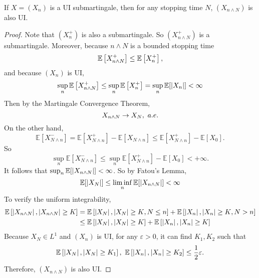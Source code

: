 \begin{thm}
    If $X=(X_n)$ is a UI submartingale, then for any stopping time $N$, $(X_{n \wedge N})$ is also UI.
\end{thm}
\begin{proof}
    Note that $(X_n^+)$ is also a submartingale. So $(X_{n \wedge N}^+)$ is a submartingale. Moreover, because $n \wedge N$ is a bounded stopping time
    \begin{equation*}
        \mathbb{E}\left[X_{n \wedge N}^+\right] \leq \mathbb{E}\left[X_n^+\right],
    \end{equation*}
    and because $(X_n)$ is UI,
    \begin{equation*}
        \sup_n\mathbb{E}\left[X_{n \wedge N}^+\right] \leq \sup_n\mathbb{E}\left[X_n^+\right] = \sup_n \mathbb{E}[\left\lvert X_n\right\lvert] < \infty
    \end{equation*}
    Then by the Martingale Convergence Theorem,
    \begin{equation*}
        X_{n \wedge N} \rightarrow X_N,~a.e.
    \end{equation*}
    On the other hand,
    \begin{equation*}
        \mathbb{E}\left[X_{N \wedge n}^{-}\right]=\mathbb{E}\left[X_{N \wedge n}^{+}\right]-\mathbb{E}\left[X_{N \wedge n}\right] \leqslant \mathbb{E}\left[X_{N \wedge n}^{+}\right]-\mathbb{E}\left[X_0\right].
    \end{equation*}
    So
    \begin{equation*}
        \sup _n \mathbb{E}\left[X_{N \wedge n}^{-}\right] \leqslant \sup _n \mathbb{E}\left[X_{N \wedge n}^{+}\right]-\mathbb{E}\left[X_0\right]<+\infty.
    \end{equation*}
    It follows that $\sup_n \mathbb{E}[\left\lvert X_{n \wedge N}\right\lvert] < \infty$. So by Fatou's Lemma,
    \begin{equation*}
        \mathbb{E}[\left\lvert X_N\right\lvert] \leq \liminf_n \mathbb{E}[\left\lvert X_{n \wedge N}\right\lvert] < \infty
    \end{equation*}
    To verify the uniform integrability,
    \begin{equation*}
        \begin{aligned}
            \mathbb{E}\left[\left\lvert X_{n \wedge N}\right\lvert ,{\left\lvert X_{n \wedge N}\right\lvert \geq K}\right] &= \mathbb{E}\left[\left\lvert X_{N}\right\lvert ,{\left\lvert X_{N}\right\lvert \geq K},N \leq n\right]+\mathbb{E}\left[\left\lvert X_{n}\right\lvert ,{\left\lvert X_{n}\right\lvert \geq K},N > n\right] \\
            &\leq \mathbb{E}\left[\left\lvert X_{N}\right\lvert ,{\left\lvert X_{N}\right\lvert \geq K}\right] + \mathbb{E}\left[\left\lvert X_{n}\right\lvert ,{\left\lvert X_{n}\right\lvert \geq K}\right]
        \end{aligned}
    \end{equation*}
    Because $X_N \in L^1$ and $(X_n)$ is UI, for any $\varepsilon > 0$, it can find $K_1,K_2$ such that
    \begin{equation*}
        \mathbb{E}\left[\left\lvert X_{N}\right\lvert ,{\left\lvert X_{N}\right\lvert \geq K_1}\right],~\mathbb{E}\left[\left\lvert X_{n}\right\lvert ,{\left\lvert X_{n}\right\lvert \geq K_2}\right] \leq \frac{1}{2}\varepsilon.
    \end{equation*}
    Therefore, $(X_{n \wedge N})$ is also UI. \qedhere
\end{proof}
